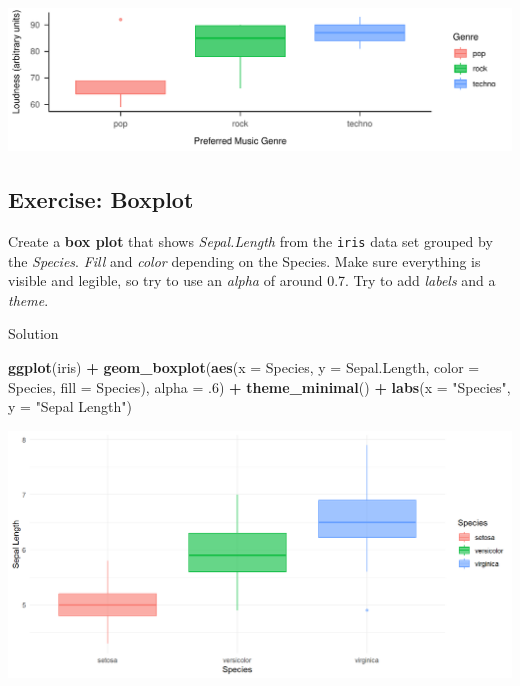 \documentclass[
]{book}
\newenvironment{Shaded}{\begin{snugshade}}{\end{snugshade}}
\newcommand{\AttributeTok}[1]{\textcolor[rgb]{0.13,0.29,0.53}{#1}}
\newcommand{\DecValTok}[1]{\textcolor[rgb]{0.00,0.00,0.81}{#1}}
\newcommand{\FunctionTok}[1]{\textcolor[rgb]{0.13,0.29,0.53}{\textbf{#1}}}
\newcommand{\NormalTok}[1]{#1}
\newcommand{\SpecialCharTok}[1]{\textcolor[rgb]{0.81,0.36,0.00}{\textbf{#1}}}
\newcommand{\StringTok}[1]{\textcolor[rgb]{0.31,0.60,0.02}{#1}}
\begin{document}
\includegraphics{_main_files/figure-html/unnamed-chunk-36-1.pdf}

\subsection{Exercise: Boxplot}\label{exercise-boxplot}

Create a \textbf{box plot} that shows \emph{Sepal.Length} from the \texttt{iris} data set grouped by the \emph{Species}.
\emph{Fill} and \emph{color} depending on the Species.
Make sure everything is visible and legible, so try to use an \emph{alpha} of around 0.7.
Try to add \emph{labels} and a \emph{theme}.

Solution

\begin{Shaded}
\begin{Highlighting}[]
\FunctionTok{ggplot}\NormalTok{(iris) }\SpecialCharTok{+} 
  \FunctionTok{geom\_boxplot}\NormalTok{(}\FunctionTok{aes}\NormalTok{(}\AttributeTok{x =}\NormalTok{ Species, }\AttributeTok{y =}\NormalTok{ Sepal.Length,}
                   \AttributeTok{color =}\NormalTok{ Species, }\AttributeTok{fill =}\NormalTok{ Species), }\AttributeTok{alpha =}\NormalTok{ .}\DecValTok{6}\NormalTok{) }\SpecialCharTok{+}
  \FunctionTok{theme\_minimal}\NormalTok{() }\SpecialCharTok{+} \FunctionTok{labs}\NormalTok{(}\AttributeTok{x =} \StringTok{"Species"}\NormalTok{, }\AttributeTok{y =} \StringTok{"Sepal Length"}\NormalTok{)}
\end{Highlighting}
\end{Shaded}

\begin{flushleft}\includegraphics{_main_files/figure-html/unnamed-chunk-37-1} \end{flushleft}
\end{document}
